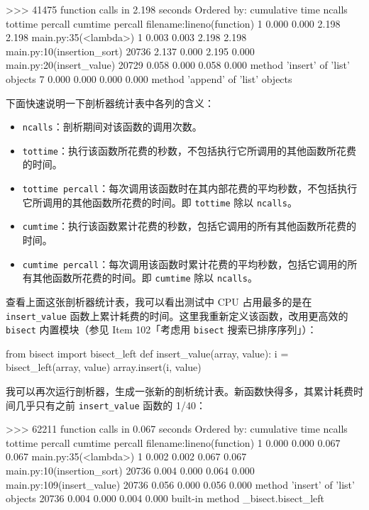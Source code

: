\begin{codebox}[python]
>>>
        41475 function calls in 2.198 seconds
  Ordered by: cumulative time
  ncalls tottime percall cumtime percall filename:lineno(function)
        1   0.000   0.000   2.198   2.198 main.py:35(<lambda>)
        1   0.003   0.003   2.198   2.198 main.py:10(insertion_sort)
    20736   2.137   0.000   2.195   0.000 main.py:20(insert_value)
    20729   0.058   0.000   0.058   0.000 {method 'insert' of 'list' objects}
        7   0.000   0.000   0.000   0.000 {method 'append' of 'list' objects}
\end{codebox}

下面快速说明一下剖析器统计表中各列的含义：

\begin{itemize}
\item \texttt{ncalls}：剖析期间对该函数的调用次数。
\item \texttt{tottime}：执行该函数所花费的秒数，不包括执行它所调用的其他函数所花费的时间。
\item \texttt{tottime percall}：每次调用该函数时在其内部花费的平均秒数，不包括执行它所调用的其他函数所花费的时间。即 \texttt{tottime} 除以 \texttt{ncalls}。
\item \texttt{cumtime}：执行该函数累计花费的秒数，包括它调用的所有其他函数所花费的时间。
\item \texttt{cumtime percall}：每次调用该函数时累计花费的平均秒数，包括它调用的所有其他函数所花费的时间。即 \texttt{cumtime} 除以 \texttt{ncalls}。
\end{itemize}

查看上面这张剖析器统计表，我可以看出测试中 CPU 占用最多的是在 \texttt{insert\_value} 函数上累计耗费的时间。这里我重新定义该函数，改用更高效的 \texttt{bisect} 内置模块（参见 Item 102「考虑用 \texttt{bisect} 搜索已排序序列」）：

\begin{codebox}[python]
from bisect import bisect_left
def insert_value(array, value):
    i = bisect_left(array, value)
    array.insert(i, value)
\end{codebox}

我可以再次运行剖析器，生成一张新的剖析统计表。新函数快得多，其累计耗费时间几乎只有之前 \texttt{insert\_value} 函数的 1/40：

\begin{codebox}[python]
>>>
        62211 function calls in 0.067 seconds
  Ordered by: cumulative time
  ncalls tottime percall cumtime percall filename:lineno(function)
        1   0.000   0.000   0.067   0.067 main.py:35(<lambda>)
        1   0.002   0.002   0.067   0.067 main.py:10(insertion_sort)
    20736   0.004   0.000   0.064   0.000 main.py:109(insert_value)
    20736   0.056   0.000   0.056   0.000 {method 'insert' of 'list' objects}
    20736   0.004   0.000   0.004   0.000 {built-in method _bisect.bisect_left}
\end{codebox}

